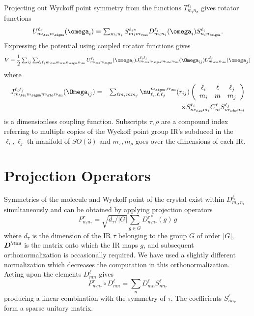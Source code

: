 \documentclass[preprint]{iucr}              %
\newcommand{\mb}[1]{\ensuremath{\mbox{\boldmath $ #1 $}}}
\begin{document}
Projecting out Wyckoff point symmetry from the functions
$T^{\ell_i}_{m_i n_\sigma}$ gives rotator functions
\begin{equation}
\label{eq:rotfunc}U^{\ell_i}_{m_\tau n_\sigma}(\mb{\omega}_i)=\sum_{m_i
n_i}S^{\ell_i*}_{m_im_\tau}D_{m_i
n_i}^{\ell_i}(\mb{\omega}_i)S^{\ell_i}_{n_in_\sigma}.
\end{equation}
Expressing the potential using coupled rotator functions gives
\begin{equation}
\label{eq:vij2}V = \frac{1}{2}\sum_{ij}\sum_{\ell_i\ell_j m_\tau m_\rho
n_\sigma n_\mu} U^{\ell_i}_{m_\tau
n_\sigma}(\mb{\omega}_i)J_{m_\tau n_\sigma m_\rho n_\mu}^{\ell_i
\ell_j}(\mb{\Omega}_{ij})U^{\ell_j}_{m_\rho
n_\mu}(\mb{\omega}_j)
\end{equation}
where
\begin{eqnarray}
 J_{m_\tau n_\sigma m_\rho
n_\mu}^{\ell_i \ell_j}(\mb{\Omega}_{ij})&=&\sum_{\ell m_i m m_j}
\nu_{\ell_i,\ell,\ell_j}^{n_\sigma,n_\mu}(r_{ij})\left(\begin{array}{
ccc}
 \ell_i & \ell & \ell_j \\ m_i & m & m_j
\end{array}\right)\nonumber\\
&&\times S^{\ell_i}_{m_\tau m_i}C_{m}^{\ell} S^{\ell_j}_{m_\rho
m_j}
\end{eqnarray}
is a dimensionless coupling function. Subscripts $\tau,\rho$ are a
compound index referring to multiple copies of the Wyckoff point
group IR's subduced in the $\ell_i,\ell_j$-th manifold of $SO(3)$
and $m_\tau,m_\rho$ goes over the dimensions of each IR. 	

\pagebreak


\section{Projection Operators}
\label{Appx:proj}

Symmetries of the molecule and Wyckoff point of the crystal exist
within $D_{m_i,n_i}^{\ell_i}$ simultaneously and can be obtained
by applying projection operators
\cite{Bradley72}
\begin{equation}
P^{\tau}_{n_\tau n_\tau}=\sqrt{d_\tau/|G|}\sum_{g\in G}D^{\tau
*}_{n_\tau n_\tau}(g)\,g
\end{equation}
where $d_\tau$ is the dimension of the IR $\tau$ belonging to the
group $G$ of order $|G|$, $\mb{D}^\tau$ is the matrix onto which
the IR maps $g$, and subsequent orthonormalization is occasionally
required. We have used a slightly different normalization which
decreases the computation in this orthonormalization. Acting upon
the elements $D_{mn}^{\ell}$ gives
\begin{equation}
P^{\tau}_{n_\tau n_\tau}\circ D_{mn}^{\ell}=\sum_n
D_{mn}^{\ell}S_{nn_\tau}^\ell
\end{equation}
producing a linear combination with the symmetry of $\tau$.  The
coefficients $S_{nn_\tau}^\ell$ form a sparse unitary matrix.
\end{document}
